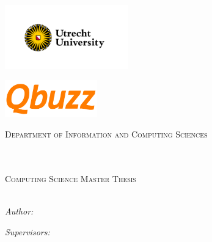 \documentclass[./main.tex]{subfiles}
\begin{document}


\makeatletter
\begin{titlepage}
    \begin{center}

    \vspace*{.02\textheight}
    {\includegraphics[align=c, width=0.4\textwidth]{uulogo.png}}%
    {\includegraphics[align=c, width=0.3\textwidth]{qbuzzlogo.png}\par}%
    \textsc{\Large Department of Information and Computing Sciences}\\[0.5cm] %

    \HRule \\[0.4cm] %
    {\huge \bfseries \@title \par}\vspace{0.4cm}
    \HRule \\[0.5cm] %

    {\Large \textsc{
        Computing Science Master Thesis \\[0.2cm]
        \large{\@studentnumber}
    }} \\[5.5cm]


    \begin{minipage}[t]{0.4\textwidth}
        \begin{flushleft} \large
            \emph{Author:}\\
            \@author
        \end{flushleft}
    \end{minipage}
    \begin{minipage}[t]{0.4\textwidth}
        \begin{flushright} \large
            \emph{Supervisors:} \\
            \@firstsupervisor \\
            \@secondsupervisor \\
            \@dailysupervisor \\
            \@externalsupervisor
        \end{flushright}
    \end{minipage}\\[2cm]


\end{center}
\end{titlepage}
\end{document}
